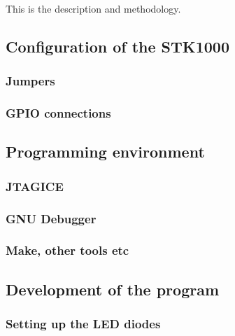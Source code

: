 This is the description and methodology.

\subsection{Configuration of the STK1000}

    \subsubsection{Jumpers}

        

    \subsubsection{GPIO connections}

        

\subsection{Programming environment}

    \subsubsection{JTAGICE}

        

    \subsubsection{GNU Debugger}

    \subsubsection{Make, other tools etc}

\subsection{Development of the program}

    \subsubsection{Setting up the LED diodes}
        
        

